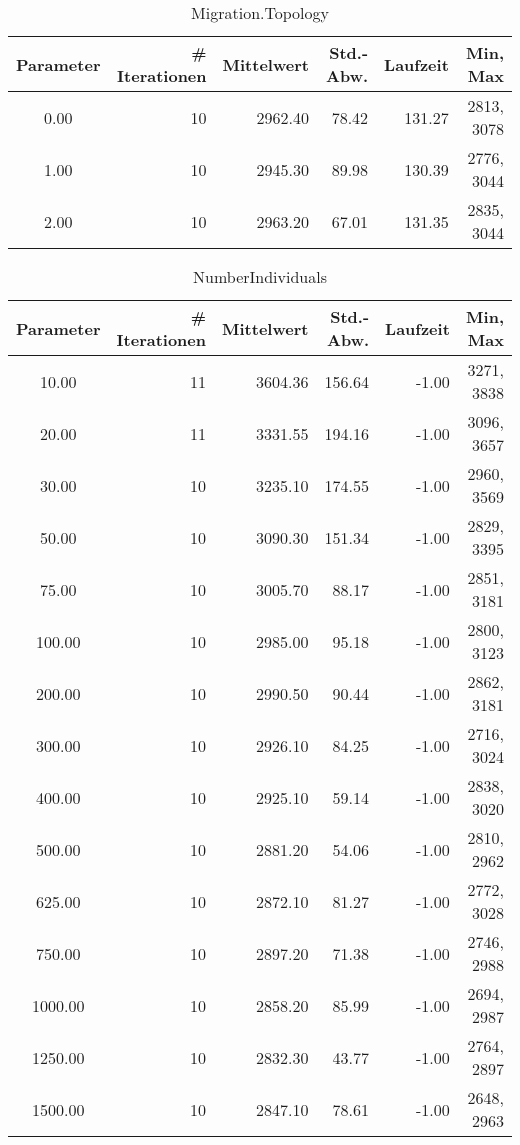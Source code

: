 \begin{table}[tbph]
\begin{tabular}{ | c || r | r | r | r | r | }
\hline
Parameter & \# Iterationen & Mittelwert & Std.-Abw. & Laufzeit & Min, Max \\
\hline
   0.00 &  10 & 2962.40 &   78.42 &  131.27 & 2813, 3078 \\
   1.00 &  10 & 2945.30 &   89.98 &  130.39 & 2776, 3044 \\
   2.00 &  10 & 2963.20 &   67.01 &  131.35 & 2835, 3044 \\
\hline
\end{tabular}
\caption{Migration.Topology}\label{Migration.Topology}
\end{table}


\begin{table}[tbph]
\begin{tabular}{ | c || r | r | r | r | r | }
\hline
Parameter & \# Iterationen & Mittelwert & Std.-Abw. & Laufzeit & Min, Max \\
\hline
  10.00 &  11 & 3604.36 &  156.64 &   -1.00 & 3271, 3838 \\
  20.00 &  11 & 3331.55 &  194.16 &   -1.00 & 3096, 3657 \\
  30.00 &  10 & 3235.10 &  174.55 &   -1.00 & 2960, 3569 \\
  50.00 &  10 & 3090.30 &  151.34 &   -1.00 & 2829, 3395 \\
  75.00 &  10 & 3005.70 &   88.17 &   -1.00 & 2851, 3181 \\
 100.00 &  10 & 2985.00 &   95.18 &   -1.00 & 2800, 3123 \\
 200.00 &  10 & 2990.50 &   90.44 &   -1.00 & 2862, 3181 \\
 300.00 &  10 & 2926.10 &   84.25 &   -1.00 & 2716, 3024 \\
 400.00 &  10 & 2925.10 &   59.14 &   -1.00 & 2838, 3020 \\
 500.00 &  10 & 2881.20 &   54.06 &   -1.00 & 2810, 2962 \\
 625.00 &  10 & 2872.10 &   81.27 &   -1.00 & 2772, 3028 \\
 750.00 &  10 & 2897.20 &   71.38 &   -1.00 & 2746, 2988 \\
1000.00 &  10 & 2858.20 &   85.99 &   -1.00 & 2694, 2987 \\
1250.00 &  10 & 2832.30 &   43.77 &   -1.00 & 2764, 2897 \\
1500.00 &  10 & 2847.10 &   78.61 &   -1.00 & 2648, 2963 \\
\hline
\end{tabular}
\caption{NumberIndividuals}\label{NumberIndividuals}
\end{table}


